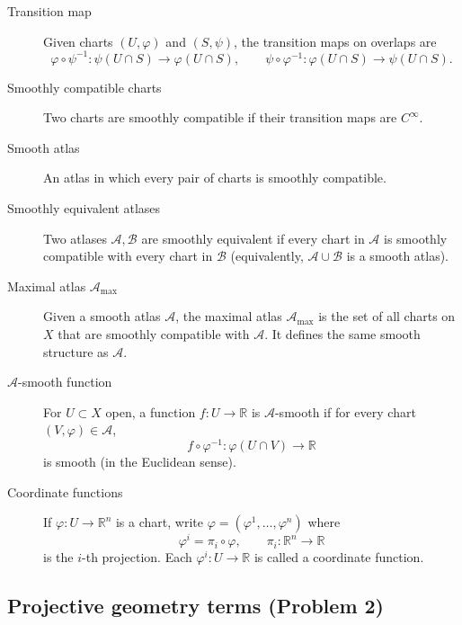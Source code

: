 \documentclass[12pt,a4paper]{article}
\theoremstyle{plain}
\theoremstyle{definition}      %
\begin{document}
\begin{description}
	\item[Transition map]
	Given charts $(U,\varphi)$ and $(S,\psi)$, the transition maps on overlaps are
	\[
	\varphi\circ\psi^{-1}:\psi(U\cap S)\to\varphi(U\cap S),
	\qquad
	\psi\circ\varphi^{-1}:\varphi(U\cap S)\to\psi(U\cap S).
	\]
	
	\item[Smoothly compatible charts]
	Two charts are smoothly compatible if their transition maps are $C^\infty$.
	
	\item[Smooth atlas]
	An atlas in which every pair of charts is smoothly compatible.
	
	\item[Smoothly equivalent atlases]
	Two atlases $\mathcal A,\mathcal B$ are smoothly equivalent if every chart in $\mathcal A$
	is smoothly compatible with every chart in $\mathcal B$
	(equivalently, $\mathcal A\cup\mathcal B$ is a smooth atlas).
	
	\item[Maximal atlas $\mathcal A_{\max}$]
	Given a smooth atlas $\mathcal A$, the maximal atlas $\mathcal A_{\max}$ is the set of all charts on $X$
	that are smoothly compatible with $\mathcal A$. It defines the same smooth structure as $\mathcal A$.
	
	\item[$\mathcal A$-smooth function]
	For $U\subset X$ open, a function $f:U\to\mathbb R$ is $\mathcal A$-smooth if for every chart $(V,\varphi)\in\mathcal A$,
	\[
	f\circ\varphi^{-1}:\varphi(U\cap V)\to\mathbb R
	\]
	is smooth (in the Euclidean sense).
	
	\item[Coordinate functions]
	If $\varphi:U\to\mathbb R^n$ is a chart, write $\varphi=(\varphi^1,\dots,\varphi^n)$ where
	\[
	\varphi^i=\pi_i\circ\varphi,\qquad \pi_i:\mathbb R^n\to\mathbb R
	\]
	is the $i$-th projection. Each $\varphi^i:U\to\mathbb R$ is called a coordinate function.
\end{description}

\subsection*{Projective geometry terms (Problem 2)}
\end{document}

